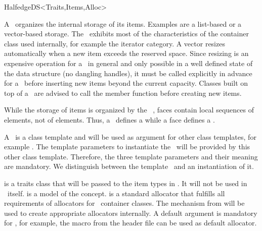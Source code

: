 \begin{ccRefConcept}{HalfedgeDS<Traits,Items,Alloc>}
\label{pageHalfedgeDSHalfedgeCycleIntro}



A \ccRefName\ organizes the internal storage of its items.  Examples
are a list-based or a vector-based storage. The \ccRefName\ exhibits
most of the characteristics of the container class used internally,
for example the iterator category. A vector resizes
automatically when a new item exceeds the reserved space. Since
resizing is an expensive operation for a \ccRefName\ in general and
only possible in a well defined state of the data structure (no
dangling handles), it must be called explicitly in advance for a
\ccRefName\ before inserting new items beyond the current capacity.
Classes built on top of a \ccRefName\ are advised to call the
 member function before creating new items.

{\XHDS
While the storage of  items is organized by the \ccRefName\ , faces contain 
local sequences of  elements, not of  elements. Thus,
a \ccRefName\ defines a  while a face defines a
.
}

\ccParameters

A \ccRefName\ is a class template and will be used as argument for
other class templates, for example . The
template parameters to instantiate the \ccRefName\ will be provided by
this other class template. Therefore, the three template parameters
and their meaning are mandatory. We distinguish between the template
\ccRefName\ and an instantiation of it.

 is a traits class that will be passed to the 
item types in . It will not be used in \ccRefName\
itself.  is a model of the  concept.
\ccc{Alloc} is a standard allocator that fulfills all requirements 
of allocators for \stl\ container classes. The  \ccc{rebind}
mechanism from  will be used to create appropriate 
allocators internally. A default argument is mandatory for
\ccc{Alloc}, for example, the macro 
from the  header file can be used as default
allocator.



\ccTypes



\end{ccRefConcept}
